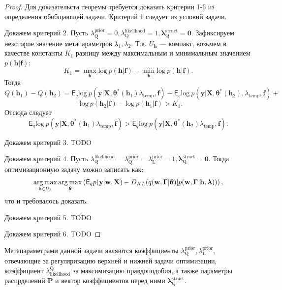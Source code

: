 \begin{proof}
Для доказательста теоремы требуется доказать критерии 1-6 из определения обобщающей задачи.
Критерий 1 следует из условий задачи.

Докажем критерий 2. Пусть $\lambda^\text{prior}_\text{Q} = 0, \lambda^\text{likelihood}_\text{Q}=1, \boldsymbol{\lambda}^\text{struct}_\text{Q} = \mathbf{0}$. Зафиксируем некоторое значение метапараметров $\lambda_1, \lambda_2$. Т.к. $U_\mathbf{h}$ --- компакт, возьмем в качестве константы $K_1$ разницу между максимальным и минимальным значением $p(\mathbf{h}|\mathbf{f})$:
\[
    K_1 = \max_{\mathbf{h}} \text{log}~p (\mathbf{h}|\mathbf{f}) - \min_{\mathbf{h}} \text{log}~p(\mathbf{h}|\mathbf{f}).
\]
Тогда $$Q(\mathbf{h}_1) - Q(\mathbf{h}_2) = \mathsf{E}_q \text{log}~p(\mathbf{y}|\mathbf{X}, \boldsymbol{\theta}^{*}(\mathbf{h}_1) \lambda_{\text{temp}}, \mathbf{f}) - \mathsf{E}_q \text{log}~p(\mathbf{y}|\mathbf{X}, \boldsymbol{\theta}^{*}(\mathbf{h}_2), \lambda_{\text{temp}}, \mathbf{f}) +$$ $$+ \text{log}~p(\mathbf{h}_2|\mathbf{f}) - \text{log}~p(\mathbf{h}_1|\mathbf{f})>K_1.$$ Отсюда следует $$\mathsf{E}_q \text{log}~p(\mathbf{y}|\mathbf{X}, \boldsymbol{\theta}^{*}(\mathbf{h}_1) \lambda_{\text{temp}}, \mathbf{f}) > \mathsf{E}_q \text{log}~p(\mathbf{y}|\mathbf{X}, \boldsymbol{\theta}^{*}(\mathbf{h}_2) \lambda_{\text{temp}}, \mathbf{f}).$$

Докажем критерий 3. TODO


Докажем критерий 4. Пусть $\lambda^\text{likelihood}_\text{Q} = \lambda^\text{prior}_\text{Q}=\lambda^\text{prior}_\text{L}=1, \boldsymbol{\lambda}^\text{struct}_\text{Q} = \mathbf{0}$. Тогда оптимизационную задачу можно записать как: $$\operatorname*{arg\,max}_{\mathbf{h} \in U_h}\operatorname*{arg\,max}_{\boldsymbol{\theta}} \left(\mathsf{E}_q p(\mathbf{y}|\mathbf{w}, \mathbf{X}) - {D}_{KL}(q(\mathbf{w}, \boldsymbol{\Gamma}|\boldsymbol{\theta})|p(\mathbf{w}, \boldsymbol{\Gamma}|\mathbf{h}, \boldsymbol{\lambda}))\right),$$ что и требовалось доказать.

Докажем критерий 5. TODO

Докажем критерий 6. TODO
\end{proof}

Метапараметрами данной задачи являются коэффициенты $\lambda^\text{prior}_\text{Q}, \lambda^\text{prior}_\text{L}$, отвечающие за регуляризацию верхней и нижней задачи оптимизации, коэффициент $\lambda_\text{likelihood}^\text{Q}$ за максимизацию правдоподобия, а также параметры распрделений $\mathbf{P}$ и вектор коэффициентов перед ними $\boldsymbol{\lambda}^\text{struct}_\text{Q}$. 


